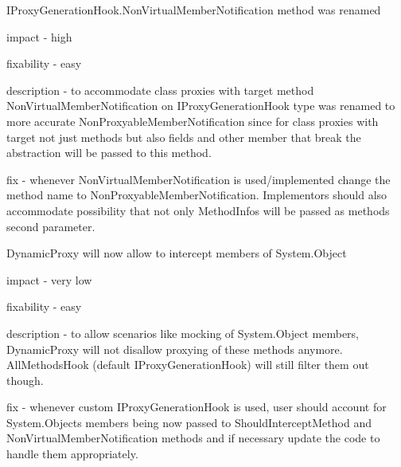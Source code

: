 \begin{DoxyItemize}
\begin{DoxyItemize}
\end{DoxyItemize}
\item I\+Proxy\+Generation\+Hook.\+Non\+Virtual\+Member\+Notification method was renamed
\begin{DoxyItemize}
\item impact -\/ high
\item fixability -\/ easy
\item description -\/ to accommodate class proxies with target method Non\+Virtual\+Member\+Notification on I\+Proxy\+Generation\+Hook type was renamed to more accurate Non\+Proxyable\+Member\+Notification since for class proxies with target not just methods but also fields and other member that break the abstraction will be passed to this method.
\item fix -\/ whenever Non\+Virtual\+Member\+Notification is used/implemented change the method name to Non\+Proxyable\+Member\+Notification. Implementors should also accommodate possibility that not only Method\+Infos will be passed as method\textquotesingle{}s second parameter.
\end{DoxyItemize}
\item Dynamic\+Proxy will now allow to intercept members of System.\+Object
\begin{DoxyItemize}
\item impact -\/ very low
\item fixability -\/ easy
\item description -\/ to allow scenarios like mocking of System.\+Object members, Dynamic\+Proxy will not disallow proxying of these methods anymore. All\+Methods\+Hook (default I\+Proxy\+Generation\+Hook) will still filter them out though.
\item fix -\/ whenever custom I\+Proxy\+Generation\+Hook is used, user should account for System.\+Object\textquotesingle{}s members being now passed to Should\+Intercept\+Method and Non\+Virtual\+Member\+Notification methods and if necessary update the code to handle them appropriately.
\end{DoxyItemize}
\end{DoxyItemize}

